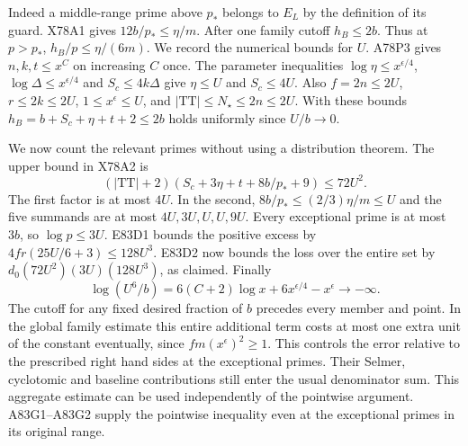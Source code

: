 Indeed a middle-range prime above $p_*$ belongs to $E_L$ by the
definition of its guard. X78A1 gives $12b/p_*\le\eta/m$.
After one family cutoff $h_B\le2b$. Thus at $p>p_*$,
$h_B/p\le\eta/(6m)$. We record the numerical bounds for $U$.
A78P3 gives $n,k,t\le x^C$ on increasing $C$ once. The
parameter inequalities $\log\eta\le x^{\epsilon/4}$,
$\log\Delta\le x^{\epsilon/4}$ and $S_c\le4k\Delta$
give $\eta\le U$ and $S_c\le4U$.
Also $f=2n\le2U$, $r\le2k\le2U$,
$1\le x^\epsilon\le U$, and
$|\mathrm{TT}|\le N_\star\le2n\le2U$.
With these bounds $h_B=b+S_c+\eta+t+2\le2b$ holds
uniformly since $U/b\to0$.

We now count the relevant primes without using a distribution
theorem. The upper bound in X78A2 is
\[
 (|\mathrm{TT}|+2)(S_c+3\eta+t+8b/p_*+9)\le72U^2 .
\]
The first factor is at most $4U$. In the second,
$8b/p_*\le(2/3)\eta/m\le U$ and the five summands are at
most $4U,3U,U,U,9U$. Every exceptional prime is at most $3b$,
so $\log p\le3U$. E83D1 bounds the positive excess by
$4fr(25U/6+3)\le128U^3$. E83D2 now bounds the loss over the
entire set by $d_0(72U^2)(3U)(128U^3)$, as claimed.
Finally
\[
  \log(U^6/b)=6(C+2)\log x+6x^{\epsilon/4}-x^\epsilon
                \longrightarrow-\infty.
\]
The cutoff for any fixed desired fraction of $b$ precedes every
member and point. In the global family estimate this entire
additional term costs at most one extra unit of the constant
eventually, since $fm(x^\epsilon)^2\ge1$. This controls the
error relative to the prescribed right hand sides at the
exceptional primes. Their Selmer, cyclotomic and baseline
contributions still enter the usual denominator sum. This aggregate estimate can be used independently of the pointwise
argument. A83G1--A83G2 supply the pointwise inequality even at
the exceptional primes in its original range.
